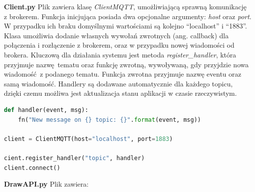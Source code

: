 \documentclass[12pt,twoside,polish]{article}
\begin{document}
\textbf{Client.py}
Plik zawiera klasę \emph{ClientMQTT}, umożliwiającą sprawną komunikację z brokerem. Funkcja inicjująca posiada dwa opcjonalne argumenty: \emph{host} oraz \emph{port}. W przypadku ich braku domyślnymi wartościami są kolejno \enquote{localhost} i \enquote{1883}. Klasa umożliwia dodanie własnych wywołań zwrotnych (ang. callback) dla połączenia i rozłączenie z brokerem, oraz w przypadku nowej wiadomości od brokera. Kluczową dla działania systemu jest metoda \emph{register\_handler}, która przyjmuje nazwę tematu oraz funkcję zwrotną, wywoływaną, gdy przyjdzie nowa wiadomość z podanego tematu. Funkcja zwrotna przyjmuje nazwę eventu oraz samą wiadomość. Handlery są dodawane automatycznie dla każdego topicu, dzięki czemu możliwa jest aktualizacja stanu aplikacji w czasie rzeczywistym.

\begin{lstlisting}[language=Python, caption=Tworzenie instancji klienta]
def handler(event, msg):
	fn("New message on {} topic: {}".format(event, msg))

client = ClientMQTT(host="localhost", port=1883)

cient.register_handler("topic", handler)
client.connect()
\end{lstlisting}

\textbf{DrawAPI.py}
Plik zawiera:
\end{document}
